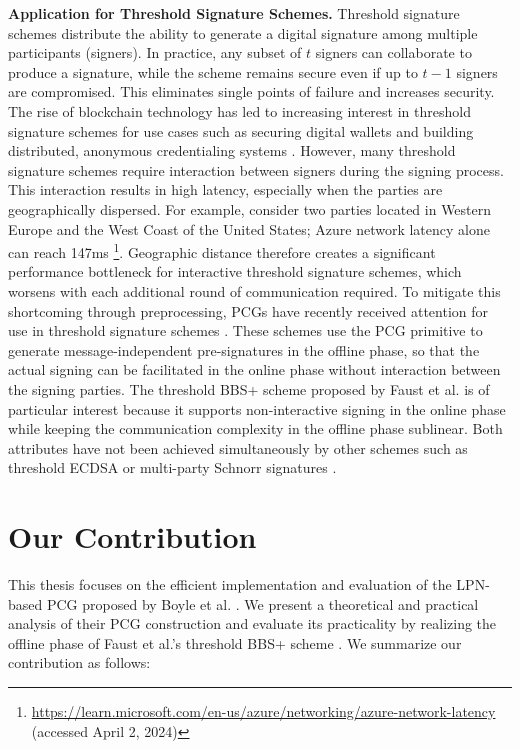 \textbf{Application for Threshold Signature Schemes.}  Threshold signature schemes \cite{desmedt1987society, desmedt1992threshold} distribute the ability to generate a digital signature among multiple participants (signers). In practice, any subset of $t$ signers can collaborate to produce a signature, while the scheme remains secure even if up to $t - 1$ signers are compromised. This eliminates single points of failure and increases security. The rise of blockchain technology has led to increasing interest in threshold signature schemes for use cases such as securing digital wallets \cite{gennaro2016threshold} and building distributed, anonymous credentialing systems \cite{garman2013decentralized}. However, many threshold signature schemes require interaction between signers during the signing process. This interaction results in high latency, especially when the parties are geographically dispersed. For example, consider two parties located in Western Europe and the West Coast of the United States; Azure network latency alone can reach 147ms \footnote{\url{https://learn.microsoft.com/en-us/azure/networking/azure-network-latency} (accessed April 2, 2024)}. Geographic distance therefore creates a significant performance bottleneck for interactive threshold signature schemes, which worsens with each additional round of communication required. To mitigate this shortcoming through preprocessing, PCGs have recently received attention for use in threshold signature schemes \cite{abram2022low, faust2023non}. These schemes use the PCG primitive to generate message-independent pre-signatures in the offline phase, so that the actual signing can be facilitated in the online phase without interaction between the signing parties. The threshold BBS+ scheme proposed by Faust et al. \cite{faust2023non} is of particular interest because it supports non-interactive signing in the online phase while keeping the communication complexity in the offline phase sublinear. Both attributes have not been achieved simultaneously by other schemes such as threshold ECDSA \cite{abram2022low} or multi-party Schnorr signatures \cite{kondi2023two}. 

\section{Our Contribution}
This thesis focuses on the efficient implementation and evaluation of the LPN-based PCG proposed by Boyle et al. \cite{boyle2020efficient}. We present a theoretical and practical analysis of their PCG construction and evaluate its practicality by realizing the offline phase of Faust et al.'s threshold BBS+ scheme \cite{faust2023non}. We summarize our contribution as follows:

